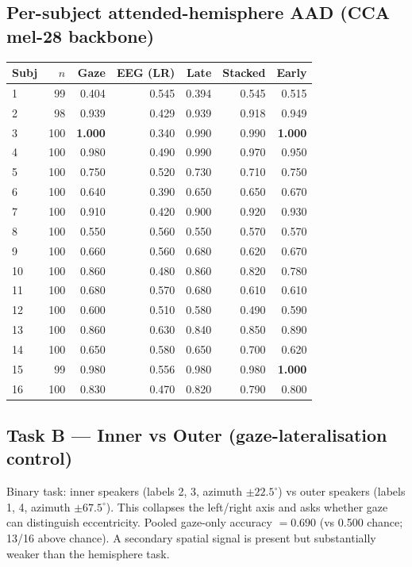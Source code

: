 \subsection{Per-subject attended-hemisphere AAD (CCA mel-28 backbone)}

\begin{table}[ht]
\centering
\begin{tabular}{lrrrrrr}
\toprule
Subj & $n$ & Gaze & EEG (LR) & Late & Stacked & Early \\
\midrule
1  &  99 & 0.404 & 0.545 & 0.394 & 0.545 & 0.515 \\
2  &  98 & 0.939 & 0.429 & 0.939 & 0.918 & 0.949 \\
3  & 100 & \textbf{1.000} & 0.340 & 0.990 & 0.990 & \textbf{1.000} \\
4  & 100 & 0.980 & 0.490 & 0.990 & 0.970 & 0.950 \\
5  & 100 & 0.750 & 0.520 & 0.730 & 0.710 & 0.750 \\
6  & 100 & 0.640 & 0.390 & 0.650 & 0.650 & 0.670 \\
7  & 100 & 0.910 & 0.420 & 0.900 & 0.920 & 0.930 \\
8  & 100 & 0.550 & 0.560 & 0.550 & 0.570 & 0.570 \\
9  & 100 & 0.660 & 0.560 & 0.680 & 0.620 & 0.670 \\
10 & 100 & 0.860 & 0.480 & 0.860 & 0.820 & 0.780 \\
11 & 100 & 0.680 & 0.570 & 0.680 & 0.610 & 0.610 \\
12 & 100 & 0.600 & 0.510 & 0.580 & 0.490 & 0.590 \\
13 & 100 & 0.860 & 0.630 & 0.840 & 0.850 & 0.890 \\
14 & 100 & 0.650 & 0.580 & 0.650 & 0.700 & 0.620 \\
15 &  99 & 0.980 & 0.556 & 0.980 & 0.980 & \textbf{1.000} \\
16 & 100 & 0.830 & 0.470 & 0.820 & 0.790 & 0.800 \\
\bottomrule
\end{tabular}
\end{table}

\subsection{Task B --- Inner vs Outer (gaze-lateralisation control)}

Binary task: inner speakers (labels 2, 3, azimuth $\pm 22.5^\circ$) vs
outer speakers (labels 1, 4, azimuth $\pm 67.5^\circ$). This collapses the
left/right axis and asks whether gaze can distinguish eccentricity. Pooled
gaze-only accuracy $= \mathbf{0.690}$ (vs 0.500 chance; 13/16 above
chance). A secondary spatial signal is present but substantially weaker
than the hemisphere task.

